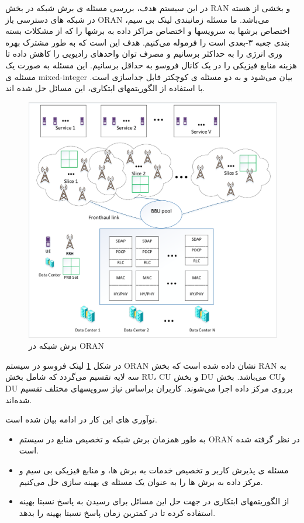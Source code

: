 در این سیستم هدف، بررسی مسئله ی برش شبکه در بخش RAN و بخشی از هسته در شبکه های دسترسی باز
ORAN
می‌باشد.
ما مسئله زمانبندی لینک بی سیم، اختصاص برشها به سرویسها و اختصاص مراکز داده به برشها را که از مشکلات بسته بندی جعبه  ۳-بعدی است را فرموله می‌کنیم. 
هدف این است که به طور مشترک بهره وری انرژی را به حداکثر برسانیم و مصرف توان واحدهای رادیویی را کاهش داده تا هزینه منابع فیزیکی را در یک کانال فروسو به حداقل برسانیم.
این مسئله به صورت یک مسئله ی 
mixed-integer
بیان می‌شود و به دو مسئله ی کوچکتر قابل جداسازی است. با استفاده از الگوریتمهای ابتکاری، این مسائل حل شده اند.
\begin{figure}
	\centering
	\includegraphics[scale=0.55]{./fig/c2.pdf}
	\caption{برش شبکه در ORAN}
	\label{fig:c11}
\end{figure}
در شکل \ref{fig:c11}
لینک فروسو در سیستم ORAN نشان داده شده است که بخش RAN به سه لایه تقسیم می‌گردد که شامل بخش RU، 
CU و
بخش DU می‌باشد.
بخش CUو DU برروی مرکز داده اجرا می‌شوند. کاربران براساس نیاز سرویسهای مختلف تقسیم شده‌اند.

نوآوری های این کار در ادامه بیان شده است.
\begin{itemize}
\item 
به طور همزمان برش شبکه و تخصیص منابع در سیستم
 ORAN
  در نظر گرفته شده است.
\item 
مسئله ی پذیرش کاربر و تخصیص خدمات به برش ها، و منابع فیزیکی بی سیم و مرکز داده به برش ها را به عنوان یک مسئله ی بهینه سازی حل می‌کنیم.
\item
از الگوریتمهای ابتکاری در جهت حل این مسائل برای رسیدن به پاسخ نسبتا بهینه استفاده کرده تا در کمترین زمان پاسخ نسبتا بهینه را بدهد.
\end{itemize} 
